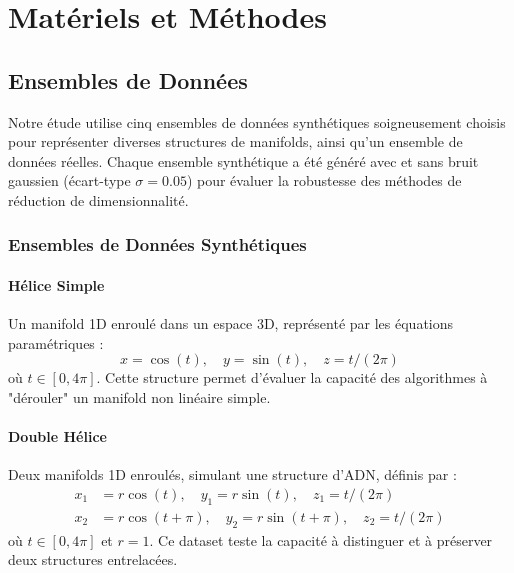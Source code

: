 \documentclass[unnumsec,webpdf,modern,large]{projet_manifold}%
\theoremstyle{thmstyleone}%
\theoremstyle{thmstyletwo}%
\theoremstyle{thmstylethree}%
\begin{document}

\section{Matériels et Méthodes}


\subsection{Ensembles de Données}

Notre étude utilise cinq ensembles de données synthétiques soigneusement choisis pour représenter diverses structures de manifolds, ainsi qu'un ensemble de données réelles. Chaque ensemble synthétique a été généré avec et sans bruit gaussien (écart-type $\sigma = 0.05$) pour évaluer la robustesse des méthodes de réduction de dimensionnalité.

\subsubsection{Ensembles de Données Synthétiques}

\paragraph{Hélice Simple} 
Un manifold 1D enroulé dans un espace 3D, représenté par les équations paramétriques :
\begin{equation}
    x = \cos(t), \quad y = \sin(t), \quad z = t / (2\pi)
\end{equation}
où $t \in [0, 4\pi]$. Cette structure permet d'évaluer la capacité des algorithmes à "dérouler" un manifold non linéaire simple.

\paragraph{Double Hélice} 
Deux manifolds 1D enroulés, simulant une structure d'ADN, définis par :
\begin{align}
    x_1 &= r \cos(t), \quad y_1 = r \sin(t), \quad z_1 = t / (2\pi) \\
    x_2 &= r \cos(t + \pi), \quad y_2 = r \sin(t + \pi), \quad z_2 = t / (2\pi)
\end{align}
où $t \in [0, 4\pi]$ et $r = 1$. Ce dataset teste la capacité à distinguer et à préserver deux structures entrelacées.
\end{document}
